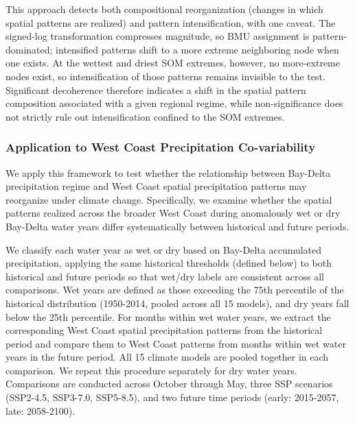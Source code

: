 This approach detects both compositional reorganization (changes in which spatial patterns are realized) and pattern intensification, with one caveat.
%
The signed-log transformation compresses magnitude, so BMU assignment is pattern-dominated; intensified patterns shift to a more extreme neighboring node when one exists.
%
At the wettest and driest SOM extremes, however, no more-extreme nodes exist, so intensification of those patterns remains invisible to the test.
%
Significant decoherence therefore indicates a shift in the spatial pattern composition associated with a given regional regime, while non-significance does not strictly rule out intensification confined to the SOM extremes.

\subsubsection{Application to West Coast Precipitation Co-variability}

We apply this framework to test whether the relationship between Bay-Delta precipitation regime and West Coast spatial precipitation patterns may reorganize under climate change.
%
Specifically, we examine whether the spatial patterns realized across the broader West Coast during anomalously wet or dry Bay-Delta water years differ systematically between historical and future periods.

We classify each water year as wet or dry based on Bay-Delta accumulated precipitation, applying the same historical thresholds (defined below) to both historical and future periods so that wet/dry labels are consistent across all comparisons.
%
Wet years are defined as those exceeding the 75th percentile of the historical distribution (1950-2014, pooled across all 15 models), and dry years fall below the 25th percentile.
%
For months within wet water years, we extract the corresponding West Coast spatial precipitation patterns from the historical period and compare them to West Coast patterns from months within wet water years in the future period.
%
All 15 climate models are pooled together in each comparison.
%
We repeat this procedure separately for dry water years.
%
Comparisons are conducted across October through May, three SSP scenarios (SSP2-4.5, SSP3-7.0, SSP5-8.5), and two future time periods (early: 2015-2057, late: 2058-2100).
%
